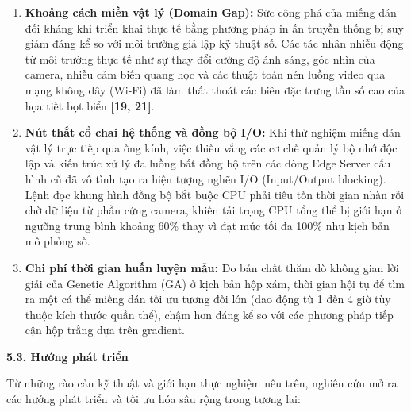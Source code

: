 \begin{enumerate}
\def\labelenumi{\arabic{enumi}.}
\item
  \textbf{Khoảng cách miền vật lý (Domain Gap):} Sức công phá của miếng
  dán đối kháng khi triển khai thực tế bằng phương pháp in ấn truyền
  thống bị suy giảm đáng kể so với môi trường giả lập kỹ thuật số. Các
  tác nhân nhiễu động từ môi trường thực tế như sự thay đổi cường độ ánh
  sáng, góc nhìn của camera, nhiễu cảm biến quang học và các thuật toán
  nén luồng video qua mạng không dây (Wi-Fi) đã làm thất thoát các biên
  đặc trưng tần số cao của họa tiết bọt biển \textbf{{[}19, 21{]}}.
\item
  \textbf{Nút thắt cổ chai hệ thống và đồng bộ I/O:} Khi thử nghiệm
  miếng dán vật lý trực tiếp qua ống kính, việc thiếu vắng các cơ chế
  quản lý bộ nhớ độc lập và kiến trúc xử lý đa luồng bất đồng bộ trên
  các dòng Edge Server cấu hình cũ đã vô tình tạo ra hiện tượng nghẽn
  I/O (Input/Output blocking). Lệnh đọc khung hình đồng bộ bắt buộc CPU
  phải tiêu tốn thời gian nhàn rỗi chờ dữ liệu từ phần cứng camera,
  khiến tải trọng CPU tổng thể bị giới hạn ở ngưỡng trung bình khoảng
  60\% thay vì đạt mức tối đa 100\% như kịch bản mô phỏng số.
\item
  \textbf{Chi phí thời gian huấn luyện mẫu:} Do bản chất thăm dò không
  gian lời giải của Genetic Algorithm (GA) ở kịch bản hộp xám, thời gian
  hội tụ để tìm ra một cá thể miếng dán tối ưu tương đối lớn (dao động
  từ 1 đến 4 giờ tùy thuộc kích thước quần thể), chậm hơn đáng kể so với
  các phương pháp tiếp cận hộp trắng dựa trên gradient.
\end{enumerate}

\textbf{5.3. Hướng phát triển}

Từ những rào cản kỹ thuật và giới hạn thực nghiệm nêu trên, nghiên cứu
mở ra các hướng phát triển và tối ưu hóa sâu rộng trong tương lai:

